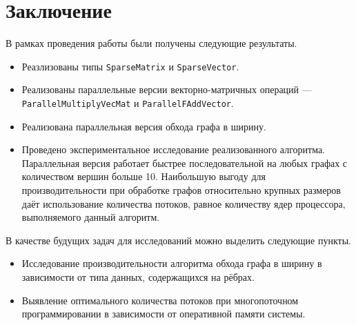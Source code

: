 
\section*{Заключение}
В рамках проведения работы были получены следующие результаты.

\begin{itemize}
\item Реазлизованы типы \texttt{SparseMatrix} и \texttt{SparseVector}.
\item Реализованы параллельные версии векторно-матричных операций --- \texttt{ParallelMultiplyVecMat} и \texttt{ParallelFAddVector}.
\item Реализована параллельная версия обхода графа в ширину.
\item Проведено экспериментальное исследование реализованного алгоритма. Параллельная версия работает быстрее последовательной на любых графах с количеством вершин больше 10. Наибольшую выгоду для производительности при обработке графов относительно крупных размеров даёт использование количества потоков, равное количеству ядер процессора, выполняемого данный алгоритм.
\end{itemize}
\noindent В качестве будущих задач для исследований можно выделить следующие пункты.
\begin{itemize}
\item Исследование производительности алгоритма обхода графа в ширину в зависимости от типа данных, содержащихся на рёбрах.
\item Выявление оптимального количества потоков при многопоточном программировании в зависимости от оперативной памяти системы.
\end{itemize}

